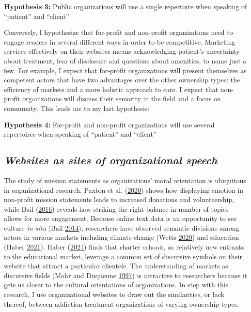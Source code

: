 \documentclass[
  12pt,
]{article}
\begin{document}
\vspace{12pt}

\textbf{Hypothesis 3:} Public organizations will use a single repertoire when speaking of ``patient'' and ``client''

\vspace{12pt}

Conversely, I hypothesize that for-profit and non-profit organizations need to engage readers in several different ways in order to be competitive. Marketing services effectively on their websites means acknowledging patient's uncertainty about treatment, fear of disclosure and questions about amenities, to name just a few.
For example, I expect that for-profit organizations will present themselves as competent actors that have two advantages over the other ownership types: the efficiency of markets and a more holistic approach to care. I expect that non-profit organizations will discuss their seniority in the field and a focus on community. This leads me to my last hypothesis:

\vspace{12pt}

\textbf{Hypothesis 4:} For-profit and non-profit organizations will use several repertoires when speaking of ``patient'' and ``client''

\vspace{12pt}

\hypertarget{websites-as-sites-of-organizational-speech}{%
\subsection{\texorpdfstring{\emph{Websites as sites of organizational speech}}{Websites as sites of organizational speech}}\label{websites-as-sites-of-organizational-speech}}

The study of mission statements as organizations' moral orientation is ubiquitous in organizational research. Paxton et al. (\protect\hyperlink{ref-paxton2020}{2020}) shows how displaying emotion in non-profit mission statements leads to increased donations and volunteership, while Bail (\protect\hyperlink{ref-bail2016}{2016}) reveals how striking the right balance in number of topics allows for more engagement. Because online text data is an opportunity to see culture \emph{in situ} (Bail \protect\hyperlink{ref-bail2014}{2014}), researchers have observed semantic divisions among actors in various markets including climate change (Wetts \protect\hyperlink{ref-wetts2020}{2020}) and education (Haber \protect\hyperlink{ref-haber2021}{2021}). Haber (\protect\hyperlink{ref-haber2021}{2021}) finds that charter schools, as relatively new entrants to the educational market, leverage a common set of discursive symbols on their website that attract a particular clientele. The understanding of markets as discursive fields (Mohr and Duquenne \protect\hyperlink{ref-mohr1997}{1997}) is attractive to researchers because it gets us closer to the cultural orientations of organizations. In step with this research, I use organizational websites to draw out the similarities, or lack thereof, between addiction treatment organizations of varying ownership types.
\end{document}
